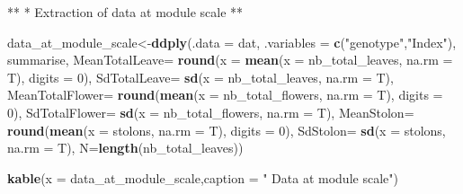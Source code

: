 \documentclass[]{article}
\newenvironment{Shaded}{\begin{snugshade}}{\end{snugshade}}
\newcommand{\KeywordTok}[1]{\textcolor[rgb]{0.13,0.29,0.53}{\textbf{#1}}}
\newcommand{\DataTypeTok}[1]{\textcolor[rgb]{0.13,0.29,0.53}{#1}}
\newcommand{\DecValTok}[1]{\textcolor[rgb]{0.00,0.00,0.81}{#1}}
\newcommand{\StringTok}[1]{\textcolor[rgb]{0.31,0.60,0.02}{#1}}
\newcommand{\NormalTok}[1]{#1}
\begin{document}
** * Extraction of data at module scale **

\begin{Shaded}
\begin{Highlighting}[]
\NormalTok{data_at_module_scale<-}\KeywordTok{ddply}\NormalTok{(}\DataTypeTok{.data =}\NormalTok{ dat,}
                            \DataTypeTok{.variables =} \KeywordTok{c}\NormalTok{(}\StringTok{"genotype"}\NormalTok{,}\StringTok{"Index"}\NormalTok{),}
\NormalTok{                            summarise,}
                            \DataTypeTok{MeanTotalLeave=} \KeywordTok{round}\NormalTok{(}\DataTypeTok{x =} \KeywordTok{mean}\NormalTok{(}\DataTypeTok{x =}\NormalTok{ nb_total_leaves,}
                                                           \DataTypeTok{na.rm =}\NormalTok{ T),}
                                                  \DataTypeTok{digits =} \DecValTok{0}\NormalTok{),}
                            \DataTypeTok{SdTotalLeave=} \KeywordTok{sd}\NormalTok{(}\DataTypeTok{x =}\NormalTok{ nb_total_leaves,}
                                  \DataTypeTok{na.rm =}\NormalTok{ T),}
                            \DataTypeTok{MeanTotalFlower=} \KeywordTok{round}\NormalTok{(}\KeywordTok{mean}\NormalTok{(}\DataTypeTok{x =}\NormalTok{ nb_total_flowers,}
                                                        \DataTypeTok{na.rm =}\NormalTok{ T),}
                                                   \DataTypeTok{digits =} \DecValTok{0}\NormalTok{),}
                            \DataTypeTok{SdTotalFlower=} \KeywordTok{sd}\NormalTok{(}\DataTypeTok{x =}\NormalTok{ nb_total_flowers,}
                                              \DataTypeTok{na.rm =}\NormalTok{ T),}
                            \DataTypeTok{MeanStolon=} \KeywordTok{round}\NormalTok{(}\KeywordTok{mean}\NormalTok{(}\DataTypeTok{x =}\NormalTok{ stolons,}
                                                   \DataTypeTok{na.rm =}\NormalTok{ T),}
                                              \DataTypeTok{digits =} \DecValTok{0}\NormalTok{),}
                            \DataTypeTok{SdStolon=} \KeywordTok{sd}\NormalTok{(}\DataTypeTok{x =}\NormalTok{ stolons,}
                                         \DataTypeTok{na.rm =}\NormalTok{ T),}
                            \DataTypeTok{N=}\KeywordTok{length}\NormalTok{(nb_total_leaves))}

\KeywordTok{kable}\NormalTok{(}\DataTypeTok{x =}\NormalTok{ data_at_module_scale,}\DataTypeTok{caption =} \StringTok{" Data at module scale"}\NormalTok{)}
\end{Highlighting}
\end{Shaded}
\end{document}
